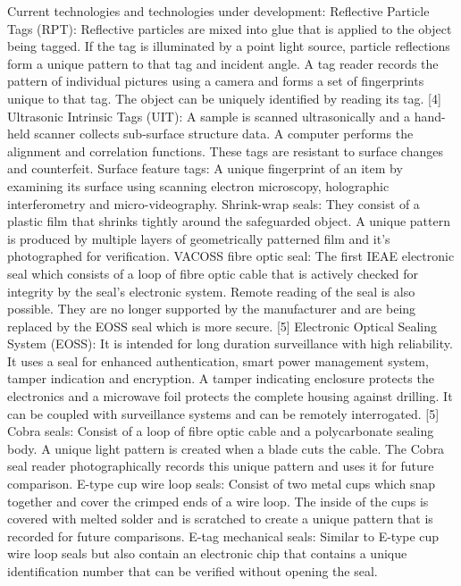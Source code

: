 \documentclass[twocolumn,a4paper]{article}
\begin{document}
Current technologies and technologies under development: \citep{zarimpas2003}
Reflective Particle Tags (RPT): Reflective particles are mixed into glue that is applied to the
object being tagged. If the tag is illuminated by a point light source, particle reflections form a
unique pattern to that tag and incident angle. A tag reader records the pattern of individual
pictures using a camera and forms a set of fingerprints unique to that tag. The object can be
uniquely identified by reading its tag. [4]
Ultrasonic Intrinsic Tags (UIT): A sample is scanned ultrasonically and a hand-held scanner
collects sub-surface structure data. A computer performs the alignment and correlation
functions. These tags are resistant to surface changes and counterfeit.
Surface feature tags: A unique fingerprint of an item by examining its surface using scanning
electron microscopy, holographic interferometry and micro-videography.
Shrink-wrap seals: They consist of a plastic film that shrinks tightly around the safeguarded
object. A unique pattern is produced by multiple layers of geometrically patterned film and it’s
photographed for verification.
VACOSS fibre optic seal: The first IEAE electronic seal which consists of a loop of fibre optic cable
that is actively checked for integrity by the seal’s electronic system. Remote reading of the seal is
also possible. They are no longer supported by the manufacturer and are being replaced by the
EOSS seal which is more secure. [5]
Electronic Optical Sealing System (EOSS): It is intended for long duration surveillance with high
reliability. It uses a seal for enhanced authentication, smart power management system, tamper
indication and encryption. A tamper indicating enclosure protects the electronics and a 
microwave foil protects the complete housing against drilling. It can be coupled with surveillance
systems and can be remotely interrogated. [5]
Cobra seals: Consist of a loop of fibre optic cable and a polycarbonate sealing body. A unique
light pattern is created when a blade cuts the cable. The Cobra seal reader photographically
records this unique pattern and uses it for future comparison.
E-type cup wire loop seals: Consist of two metal cups which snap together and cover the
crimped ends of a wire loop. The inside of the cups is covered with melted solder and is
scratched to create a unique pattern that is recorded for future comparisons.
E-tag mechanical seals: Similar to E-type cup wire loop seals but also contain an electronic chip
that contains a unique identification number that can be verified without opening the seal.
\end{document}
